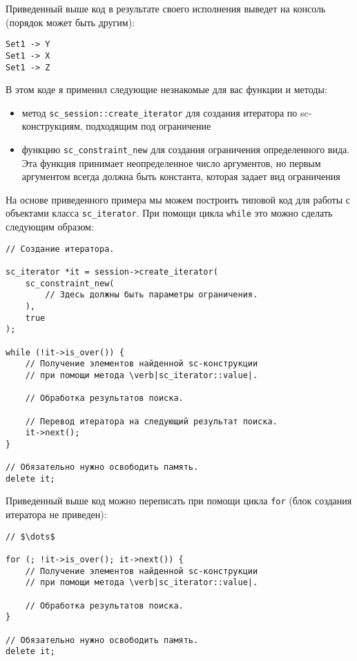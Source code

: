 Приведенный выше код в результате своего исполнения выведет на консоль
(порядок может быть другим):

\begin{verbatim}
Set1 -> Y
Set1 -> X
Set1 -> Z
\end{verbatim}

В этом коде я применил следующие незнакомые для вас функции и методы:

\begin{itemize}
\item метод \lstinline|sc_session::create_iterator| для создания
  итератора по sc-конструкциям, подходящим под ограничение
\item функцию \lstinline|sc_constraint_new| для создания ограничения
  определенного вида. Эта функция принимает неопределенное число
  аргументов, но первым аргументом всегда должна быть константа,
  которая задает вид ограничения
\end{itemize}

На основе приведенного примера мы можем построить типовой код для
работы с объектами класса \lstinline|sc_iterator|. При помощи цикла
\lstinline|while| это можно сделать следующим образом:

\begin{lstlisting}[texcl]
// Создание итератора.

sc_iterator *it = session->create_iterator(
    sc_constraint_new(
        // Здесь должны быть параметры ограничения.
    ),
    true
);

while (!it->is_over()) {
    // Получение элементов найденной sc-конструкции
    // при помощи метода \verb|sc_iterator::value|.

    // Обработка результатов поиска.

    // Перевод итератора на следующий результат поиска.
    it->next();
}

// Обязательно нужно освободить память.
delete it;
\end{lstlisting}

Приведенный выше код можно переписать при помощи цикла \lstinline|for|
(блок создания итератора не приведен):

\begin{lstlisting}[texcl]
// $\dots$

for (; !it->is_over(); it->next()) {
    // Получение элементов найденной sc-конструкции
    // при помощи метода \verb|sc_iterator::value|.

    // Обработка результатов поиска.
}

// Обязательно нужно освободить память.
delete it;
\end{lstlisting}

